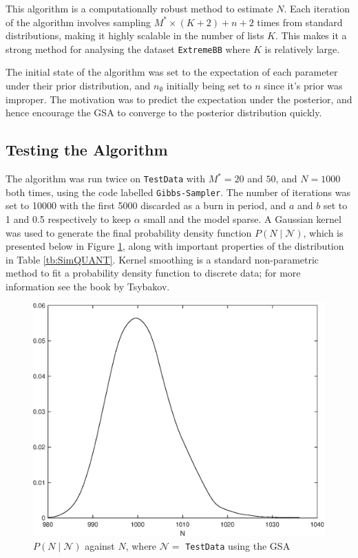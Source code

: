 \documentclass[10pt,a4paper,notitlepage]{article}
\begin{document}
This algorithm is a computationally robust method to estimate $N$. Each iteration of the algorithm involves sampling $M^{*}\times (K+2)+n+2$ times from standard distributions, making it highly scalable in the number of lists $K$. This makes it a strong method for analysing the dataset \texttt{ExtremeBB} where $K$ is relatively large.

The initial state of the algorithm was set to the expectation of each parameter under their prior distribution, and $n_{\emptyset}$ initially being set to $n$ since it's prior was improper. The motivation was to predict the expectation under the posterior, and hence encourage the GSA to converge to the posterior distribution quickly.

\subsection{Testing the Algorithm}
The algorithm was run twice on \texttt{TestData} with $M^{*}=20$ and $50$, and $N=1000$ both times, using the code labelled \texttt{Gibbs-Sampler}. The number of iterations was set to 10000 with the first 5000 discarded as a burn in period, and $a$ and $b$ set to 1 and 0.5 respectively to keep $\alpha$ small and the model sparse. A Gaussian kernel was used to generate the final probability density function $P(N\mid\mathcal{N})$, which is presented below in Figure \ref{fg:SimPDF}, along with important properties of the distribution in Table \ref{tb:SimQUANT}. Kernel smoothing is a standard non-parametric method to fit a probability density function to discrete data; for more information see the book \cite{Kernel} by Tsybakov.
\begin{figure}[H]
\centering
\includegraphics[width=12cm]{Image}
\caption{$P(N\mid \mathcal{N})$ against $N$, where $\mathcal{N}=$ \texttt{TestData} using the GSA}\label{fg:SimPDF}
\end{figure}
\end{document}
